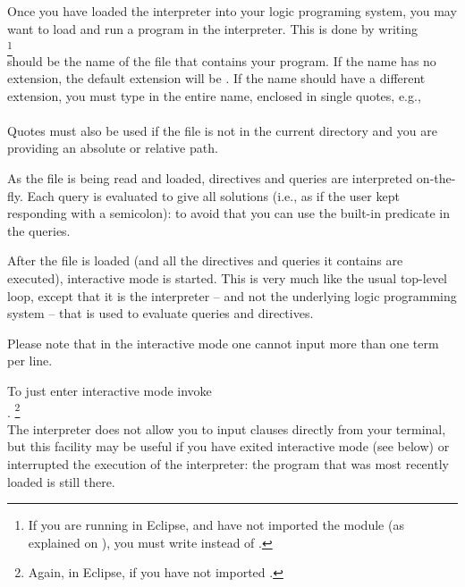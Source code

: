 


Once you have loaded the interpreter into your logic programing system, you
may want to load and run a program in the interpreter. This is done by
writing\\
\ind{}%
\footnote{
  If you are running in Eclipse, and have not imported the module 
  (as explained on ), you must write 
  instead of .
}\\
 should be the name of the file that contains your program.
If the name has no extension, the default extension will be .  If
the name should have a different extension, you must type in the entire name,
enclosed in single quotes, e.g.,\\
\ind{}\\
Quotes must also be used if the file is not in the current directory and you
are providing an absolute or relative path.

As the file is being read and loaded, directives and queries are interpreted
on-the-fly. Each query is evaluated to give all solutions (i.e., as if the
user kept responding with a semicolon): to avoid that you can use the
built-in predicate  in the queries.



After the file is loaded (and all the directives and queries it contains are
executed), interactive mode is started.  This is very much like the usual
top-level loop, except that it is the interpreter -- and not the
underlying logic programming system -- that is used to evaluate queries and
directives.

Please note that in the interactive mode one cannot input more than one term
per line.

To just enter interactive mode invoke\\
\ind{}.%
\footnote{Again,  in Eclipse, if you have not imported
  .}\\
 The interpreter does not allow you to input clauses directly from your
 terminal, but this facility may be useful if you have exited interactive
 mode (see below) or interrupted the execution of the interpreter: the
 program that was most recently loaded is still there.

